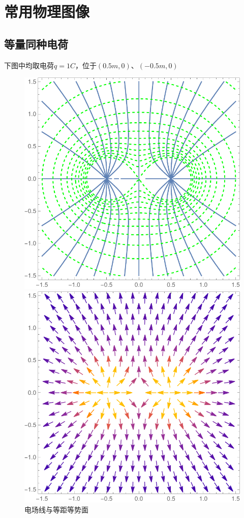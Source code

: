 \section{常用物理图像}

\subsection{等量同种电荷}

下图中均取电荷$q=1C$，位于$(0.5m,0)$、$(-0.5m,0)$

\begin{figure}[H]
\begin{minipage}[b]{0.4\linewidth}
\centering
\includegraphics[width=\textwidth]{pic_data/T/dltzdh_p1.pdf}
\caption{电场线与等距等势面}
\end{minipage}
\hfill
\begin{minipage}[b]{0.4\linewidth}
\centering
\includegraphics[width=\textwidth]{pic_data/T/dltzdh_p2.pdf}

\end{minipage}
\end{figure}
